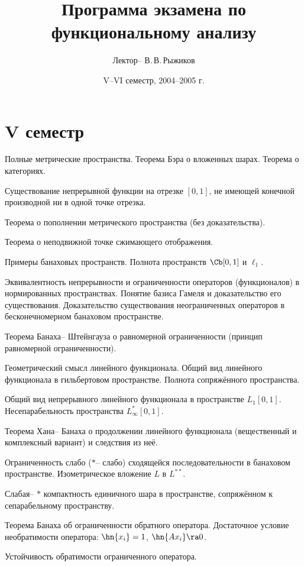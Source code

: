 \documentclass[a4paper]{article}
\title{Программа экзамена по функциональному анализу}
\author{Лектор-- В.\,В.\,Рыжиков}
\date{V--VI семестр, 2004--2005 г.}
\begin{document}
\maketitle

\section*{V семестр}

\begin{nums}{-2}
\item Полные метрические пространства. Теорема Бэра о вложенных шарах. Теорема о категориях.
\item Существование непрерывной функции на отрезке $[0,1]$, не имеющей конечной производной
      ни в одной точке отрезка.
\item Теорема о пополнении метрического пространства (без доказательства).
\item Теорема о неподвижной точке сжимающего отображения.
\item Примеры банаховых пространств. Полнота пространств $\Cb[0,1]$ и $\ell_1$.
\item Эквивалентность непрерывности и ограниченности операторов (функционалов) в
нормированных пространствах. Понятие базиса Гамеля и доказательство его
существования. Доказательство существования неограниченных операторов в
бесконечномерном банаховом пространстве.
\item Теорема Банаха-- Штейнгауза о равномерной ограниченности (принцип равномерной
ограниченности).
\item Геометрический смысл линейного функционала. Общий вид линейного функционала
в гильбертовом пространстве. Полнота сопряжённого пространства.
\item Общий вид непрерывного линейного функционала в пространстве $L_1[0,1]$.
Несепарабельность пространства $L_{\infty}^*[0,1]$.
\item Теорема Хана-- Банаха о продолжении линейного функционала (вещественный и
комплексный вариант) и следствия из неё.
\item Ограниченность слабо ($*$-- слабо) сходящейся последовательности в банаховом
пространстве. Изометрическое вложение $L$ в $L^{**}$.
\item Слабая-- $*$ компактность единичного шара в пространстве,
сопряжённом к сепарабельному пространству.
\item Теорема Банаха об ограниченности обратного оператора. Достаточное условие
необратимости оператора: $\hn{x_i} = 1$, $\hn{Ax_i} \ra 0$.
\item Устойчивость обратимости ограниченного оператора.

\end{nums}
\end{document}
